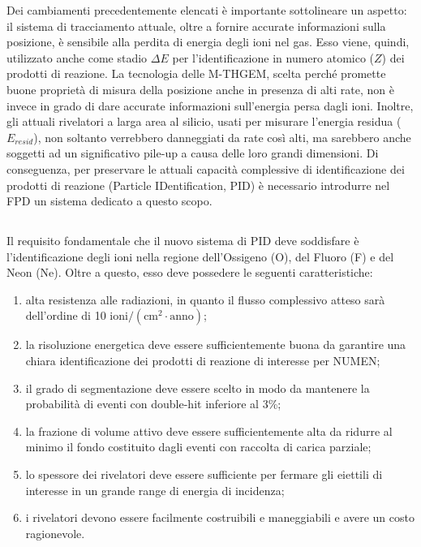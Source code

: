 Dei cambiamenti precedentemente elencati è importante sottolineare un aspetto: il sistema di tracciamento attuale, oltre a fornire accurate informazioni sulla posizione, è sensibile alla perdita di energia degli ioni nel gas. Esso viene, quindi, utilizzato anche come stadio $\Delta E$ per l'identificazione in numero atomico ($Z$) dei prodotti di reazione.
La tecnologia delle M-THGEM, scelta perché promette buone proprietà di misura della posizione anche in presenza di alti rate, non è invece in grado di dare accurate informazioni sull'energia persa dagli ioni.
Inoltre, gli attuali rivelatori a larga area al silicio, usati per misurare l'energia residua ($ E_{resid} $), non soltanto verrebbero danneggiati da rate così alti, ma sarebbero anche soggetti ad un significativo pile-up a causa delle loro grandi dimensioni.
Di conseguenza, per preservare le attuali capacità complessive di identificazione dei prodotti di reazione (Particle IDentification, PID) è necessario introdurre nel FPD un sistema dedicato a questo scopo.



\subsection{} \label{sez:sistema_identif_part}


Il requisito fondamentale che il nuovo sistema di PID deve soddisfare è l'identificazione degli ioni nella regione dell'Ossigeno (O), del Fluoro (F) e del Neon (Ne). 
Oltre a questo, esso deve possedere le seguenti caratteristiche:
\begin{enumerate}
	\item alta resistenza alle radiazioni, in quanto il flusso complessivo atteso sarà dell'ordine di 10 $\mbox{ioni}/(\mbox{cm}^2 \cdot \mbox{anno})$;
	\item la risoluzione energetica deve essere sufficientemente buona da garantire una chiara identificazione dei prodotti di reazione di interesse per NUMEN;
	\item il grado di segmentazione deve essere scelto in modo da mantenere la probabilità di eventi con double-hit inferiore al 3\%;
	\item la frazione di volume attivo deve essere sufficientemente alta da ridurre al minimo il fondo costituito dagli eventi con raccolta di carica parziale;
	\item lo spessore dei rivelatori deve essere sufficiente per fermare gli eiettili di interesse in un grande range di energia di incidenza;
	\item i rivelatori devono essere facilmente costruibili e maneggiabili e avere un costo ragionevole.
\end{enumerate}



